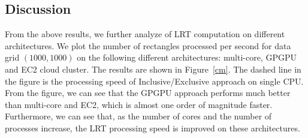 \documentclass[AMA,LATO1COL]{WileyNJD-v2}
\begin{document}
\subsection{Discussion}
From the above results, we further analyze of LRT computation on different architectures. We plot the number of rectangles processed per second for data grid $(1000,1000)$ on the following different architectures: multi-core, GPGPU and EC2 cloud cluster. The results are shown in Figure~\ref{cm}. The dashed line in the figure is the processing speed of Inclusive/Exclusive approach on single CPU. From the figure, we can see that the GPGPU approach performs much better than multi-core and EC2, which is almost one order of magnitude faster. Furthermore, we can see that, as the number of cores and the number of processes increase, the LRT processing speed is improved on these architectures. \\
\end{document}
